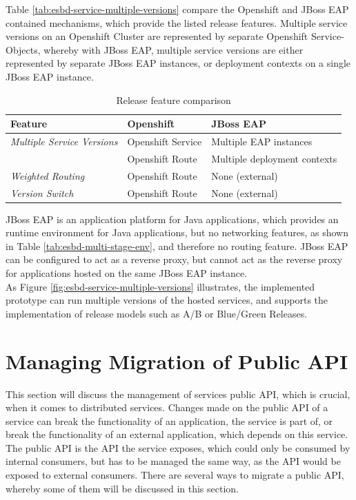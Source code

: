 Table \vref{tab:esbd-service-multiple-versions} compare the Openshift and JBoss EAP contained mechanisms, which provide the listed release features. Multiple service versions on an Openshift Cluster are represented by separate Openshift Service-Objects, whereby with JBoss EAP, multiple service versions are either represented by separate JBoss EAP instances, or deployment contexts on a single JBoss EAP instance.

{\renewcommand{\arraystretch}{1.2}%
	\begin{table}[h]
		\begin{tabularx}{\textwidth}{ X|X|X }	
			\textbf{Feature}                  & \textbf{Openshift}      & \textbf{JBoss EAP} \\  \hline
			\textit{Multiple Service Versions}& Openshift Service       & Multiple EAP instances \\
											  & Openshift Route    	    & Multiple deployment contexts \\ \hline
			\textit{Weighted Routing}         & Openshift Route         & None (external) \\  \hline
			\textit{Version Switch}           & Openshift Route         & None (external) \\  \hline
		\end{tabularx}
		\caption{Release feature comparison}
		\label{tab:esbd-service-multiple-versions}
\end{table}}

JBoss EAP is an application platform for Java applications, which provides an runtime environment for Java applications, but no networking features, as shown in Table \vref{tab:esbd-multi-stage-env}, and therefore no routing feature. JBoss EAP can be configured to act as a reverse proxy, but cannot act as the reverse proxy for applications hosted on the same JBoss EAP instance. \\

As Figure \vref{fig:esbd-service-multiple-versions} illustrates, the implemented prototype can run multiple versions of the hosted services, and supports the implementation of release models such as A/B or Blue/Green Releases.

\section{Managing Migration of Public API}
\label{sec:esbd-multi-stage-env}
This section will discuss the management of services public API, which is crucial, when it comes to distributed services. Changes made on the public API of a service can break the functionality of an application, the service is part of, or break the functionality of an external application, which depends on this service. The public API is the API the service exposes, which could only be consumed by internal consumers, but has to be managed the same way, as the API would be exposed to external consumers. There are several ways to migrate a public API, whereby some of them will be discussed in this section. \\  

